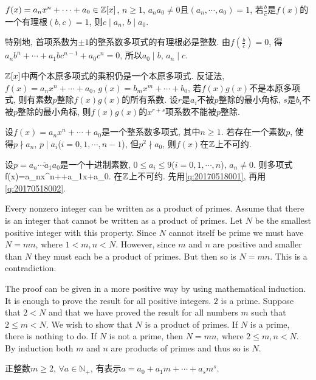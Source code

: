 $f(x)=a_nx^n+\cdots+a_0\in\mathbb{Z}[x]$, $n\ge1$, $a_na_0\ne0$且$(a_n,\cdots, a_0)=1$, 若$\frac{b}{c}$是$f(x)$的一个有理根$(b,c)=1$, 
则$c\mid a_n$, $b\mid a_0$.

特别地, 首项系数为$\pm 1$的整系数多项式的有理根必是整数.
\et
\ba
由$f\left(\frac{b}{c}\right)=0$, 得$a_nb^n+\cdots+a_1bc^{n-1}+a_0c^n=0$, 所以$a_0\mid b$, $a_n\mid c$.

{\color{red}{一种证明有理数是整数的证明途径: 证复数是整数, 先证其是有理数, 且找到作为零点的首一多项式.}}
\ea

$\mathbb{Z}[x]$中两个本原多项式的乘积仍是一个本原多项式.
\et
\ba
反证法, $f(x)=a_nx^n+\cdots+a_0$, $g(x)=b_mx^m+\cdots+b_0$, 若$f(x)g(x)$不是本原多项式, 则有素数$p$整除$f(x)g(x)$的所有系数.
设$r$是$a_i$不被$p$整除的最小角标, $s$是$b_i$不被$p$整除的最小角标, 则$f(x)g(x)$的$x^{r+s}$项系数不能被$p$整除.
\ea

设$f(x)=a_nx^n+\cdots+a_0$是一个整系数多项式, 其中$n\ge1$. 若存在一个素数$p$, 使得$p\nmid a_n$, $p\mid a_i$($i=0,1,\cdots,n-1$), 
但$p^2\nmid a_0$, 则$f(x)$在$\mathbb{Z}$上不可约.
\et

设$p=\overline{a_n\cdots a_1a_0}$是一个十进制素数, $0\le a_i\le9$($i=0,1,\cdots, n$), $a_n\ne0$. 则多项式
\bee
f(x)=a_nx^n+\cdots+a_1x+a_0.
\eee
在$\mathbb{Z}$上不可约.
\et
\ba
先用\ref{q:20170518001}, 再用\ref{q:20170518002}.
\ea

\bt{}{}
Every nonzero integer can be written as a product of primes.
\et
\ba
Assume that there is an integer that cannot be written as a product of primes.
Let $N$ be the smallest positive integer with this property. Since $N$ cannot itself be prime we must have
$N=mn$, where $1<m, n<N$. However, since $m$ and $n$ are positive and smaller than $N$ they must each be a product
of primes. But then so is $N=mn$. This is a contradiction.

The proof can be given in a more positive way by using mathematical induction.
It is enough to prove the result for all positive integers. $2$ is a prime.
Suppose that $2<N$ and that we have proved the result for all numbers $m$ such that $2\le m<N$. 
We wish to show that $N$ is a product of primes. 
If $N$ is a prime, there is nothing to do. 
If $N$ is not a prime, then $N=mn$, where $2\le m, n<N$. 
By induction both $m$ and $n$ are products of primes and thus so is $N$.
\ea

正整数$m\ge2$, $\forall a\in\mathbb{N}_{+}$, 有表示$a=a_0+a_1m+\cdots+a_sm^s$.
\et

